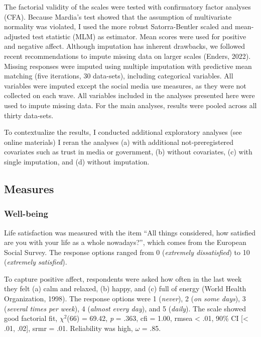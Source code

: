 \documentclass[
  man,mask,floatsintext]{apa7}
\begin{document}
The factorial validity of the scales were tested with confirmatory factor analyses (CFA).
Because Mardia's test showed that the assumption of multivariate normality was violated, I used the more robust Satorra-Bentler scaled and mean-adjusted test statistic (MLM) as estimator.
Mean scores were used for positive and negative affect.
Although imputation has inherent drawbacks, we followed recent recommendations to impute missing data on larger scales (Enders, 2022).
Missing responses were imputed using multiple imputation with predictive mean matching (five iterations, 30 data-sets), including categorical variables.
All variables were imputed except the social media use measures, as they were not collected on each wave.
All variables included in the analyses presented here were used to impute missing data.
For the main analyses, results were pooled across all thirty data-sets.

To contextualize the results, I conducted additional exploratory analyses (see online materials)
I reran the analyses (a) with additional not-preregistered covariates such as trust in media or government, (b) without covariates, (c) with single imputation, and (d) without imputation.

\subsection{Measures}\label{measures}

\subsubsection{Well-being}\label{well-being}

Life satisfaction was measured with the item ``All things considered, how satisfied are you with your life as a whole nowadays?'', which comes from the European Social Survey.
The response options ranged from 0 (\emph{extremely dissatisfied}) to 10 (\emph{extremely satisfied}).

To capture positive affect, respondents were asked how often in the last week they felt (a) calm and relaxed, (b) happy, and (c) full of energy (World Health Organization, 1998).
The response options were 1 (\emph{never}), 2 (\emph{on some days}), 3 (\emph{several times per week}), 4 (\emph{almost every day}), and 5 (\emph{daily}).
The scale showed good factorial fit, \(\chi^2\)(66) = 69.42, \textit{p} = .363, cfi = 1.00, rmsea \textless{} .01, 90\% CI {[}\textless{} .01, .02{]}, srmr = .01.
Reliability was high, \(\omega\) = .85.
\end{document}
